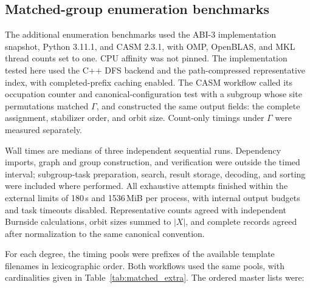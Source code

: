\documentclass[a5paper, 10pt]{article}
\begin{document}
\begingroup\setlength{\emergencystretch}{3em}
\subsection{Matched-group enumeration benchmarks}
\label{app:enum_benchmark}

The additional enumeration benchmarks used the ABI-3 implementation snapshot, Python 3.11.1, and CASM 2.3.1, with OMP, OpenBLAS, and MKL thread counts set to one. CPU affinity was not pinned. The implementation tested here used the C++ DFS backend and the path-compressed representative index, with completed-prefix caching enabled. The CASM workflow called its occupation counter and canonical-configuration test with a subgroup whose site permutations matched $\Gamma$, and constructed the same output fields: the complete assignment, stabilizer order, and orbit size. Count-only timings under $\Gamma$ were measured separately.

Wall times are medians of three independent sequential runs. Dependency imports, graph and group construction, and verification were outside the timed interval; subgroup-task preparation, search, result storage, decoding, and sorting were included where performed. All exhaustive attempts finished within the external limits of 180\,s and 1536\,MiB per process, with internal output budgets and task timeouts disabled. Representative counts agreed with independent Burnside calculations, orbit sizes summed to $|X|$, and complete records agreed after normalization to the same canonical convention.

For each degree, the timing pools were prefixes of the available template filenames in lexicographic order. Both workflows used the same pools, with cardinalities given in Table~\ref{tab:matched_extra}. The ordered master lists were:
\end{document}
